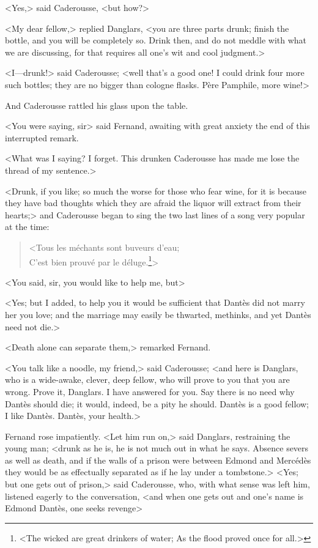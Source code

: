  <Yes,> said Caderousse, <but how?> 

 <My dear fellow,> replied Danglars, <you are three parts drunk; finish the bottle, and you will be completely so. Drink then, and do not meddle with what we are discussing, for that requires all one's wit and cool judgment.> 

 <I—drunk!> said Caderousse; <well that's a good one! I could drink four more such bottles; they are no bigger than cologne flasks. Père Pamphile, more wine!> 

 And Caderousse rattled his glass upon the table. 

 <You were saying, sir\longdash> said Fernand, awaiting with great anxiety the end of this interrupted remark. 

 <What was I saying? I forget. This drunken Caderousse has made me lose the thread of my sentence.> 

 <Drunk, if you like; so much the worse for those who fear wine, for it is because they have bad thoughts which they are afraid the liquor will extract from their hearts;> and Caderousse began to sing the two last lines of a song very popular at the time:  
 
 \begin{verse}
<Tous les méchants sont buveurs d'eau;\\ 
C'est bien prouvé par le déluge.\footnote{<The wicked are great drinkers of water; As the flood proved once for all.>}>
\end{verse}

 <You said, sir, you would like to help me, but\longdash> 

 <Yes; but I added, to help you it would be sufficient that Dantès did not marry her you love; and the marriage may easily be thwarted, methinks, and yet Dantès need not die.> 

 <Death alone can separate them,> remarked Fernand. 

 <You talk like a noodle, my friend,> said Caderousse; <and here is Danglars, who is a wide-awake, clever, deep fellow, who will prove to you that you are wrong. Prove it, Danglars. I have answered for you. Say there is no need why Dantès should die; it would, indeed, be a pity he should. Dantès is a good fellow; I like Dantès. Dantès, your health.> 

 Fernand rose impatiently. <Let him run on,> said Danglars, restraining the young man; <drunk as he is, he is not much out in what he says. Absence severs as well as death, and if the walls of a prison were between Edmond and Mercédès they would be as effectually separated as if he lay under a tombstone.>  <Yes; but one gets out of prison,> said Caderousse, who, with what sense was left him, listened eagerly to the conversation, <and when one gets out and one's name is Edmond Dantès, one seeks revenge\longdash> 

